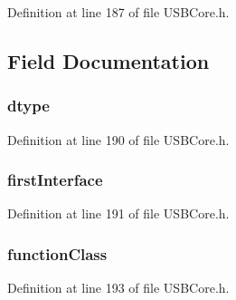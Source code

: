 Definition at line 187 of file U\+S\+B\+Core.\+h.



\subsection{Field Documentation}
\hypertarget{struct_i_a_d_descriptor_a0bb419531ec75697e63e9109fecf81b0}{}
\subsubsection[{dtype}]{ dtype}\label{struct_i_a_d_descriptor_a0bb419531ec75697e63e9109fecf81b0}


Definition at line 190 of file U\+S\+B\+Core.\+h.

\hypertarget{struct_i_a_d_descriptor_a1f310829bc6b0452ca7a433306711834}{}
\subsubsection[{first\+Interface}]{ first\+Interface}\label{struct_i_a_d_descriptor_a1f310829bc6b0452ca7a433306711834}


Definition at line 191 of file U\+S\+B\+Core.\+h.

\hypertarget{struct_i_a_d_descriptor_acf3f3dd7456fc16e020aff6bbe0f9573}{}
\subsubsection[{function\+Class}]{ function\+Class}\label{struct_i_a_d_descriptor_acf3f3dd7456fc16e020aff6bbe0f9573}


Definition at line 193 of file U\+S\+B\+Core.\+h.

\hypertarget{struct_i_a_d_descriptor_a451c6c7831d9e3e3898951c5d036081f}{}

